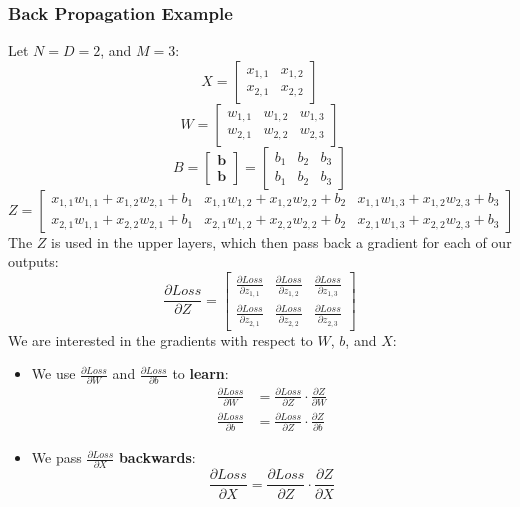 \documentclass[11pt]{article}
\begin{document}
\subsubsection{Back Propagation Example}
Let $N = D = 2$, and $M = 3$:
\[
  X = 
  \begin{bmatrix}
    x_{1, 1} & x_{1, 2} \\
    x_{2, 1} & x_{2, 2}
  \end{bmatrix}
\]
\[
  W =
  \begin{bmatrix}
    w_{1, 1} & w_{1, 2} & w_{1, 3} \\
    w_{2, 1} & w_{2, 2} & w_{2, 3}
  \end{bmatrix}
\]
\[
  B = \begin{bmatrix} \textbf{b} \\ \textbf{b} \end{bmatrix} 
  = \begin{bmatrix}
    b_1 & b_2 & b_3 \\
    b_1 & b_2 & b_3
  \end{bmatrix}
\]
\[
  Z = \begin{bmatrix}
    x_{1,1}w_{1,1} + x_{1,2}w_{2,1} + b_1 & 
    x_{1,1}w_{1,2} + x_{1,2}w_{2,2} + b_2 &
    x_{1,1}w_{1,3} + x_{1,2}w_{2,3} + b_3 \\
    x_{2,1}w_{1,1} + x_{2,2}w_{2,1} + b_1 & 
    x_{2,1}w_{1,2} + x_{2,2}w_{2,2} + b_2 &
    x_{2,1}w_{1,3} + x_{2,2}w_{2,3} + b_3
  \end{bmatrix}
\]
The $Z$ is used in the upper layers, which then pass back a gradient for each of our outputs:
\[
  \frac{\partial Loss}{\partial Z} = \begin{bmatrix}
    \frac{\partial Loss}{\partial z_{1, 1}} &
    \frac{\partial Loss}{\partial z_{1, 2}} &
    \frac{\partial Loss}{\partial z_{1, 3}} \\
    \frac{\partial Loss}{\partial z_{2, 1}} &
    \frac{\partial Loss}{\partial z_{2, 2}} &
    \frac{\partial Loss}{\partial z_{2, 3}}
  \end{bmatrix}
\]
We are interested in the gradients with respect to $W$, $b$, and $X$:
\begin{itemize}
  \item We use $\frac{\partial Loss}{\partial W}$ and $\frac{\partial Loss}{\partial b}$ to \textbf{learn}:
    \begin{align*}
      \frac{\partial Loss}{\partial W} &= \frac{\partial Loss}{\partial Z} \cdot \frac{\partial Z}{\partial W} \\
      \frac{\partial Loss}{\partial b} &= \frac{\partial Loss}{\partial Z} \cdot \frac{\partial Z}{\partial b}
    \end{align*}
  \item We pass $\frac{\partial Loss}{\partial X}$ \textbf{backwards}:
    \[
      \frac{\partial Loss}{\partial X} = \frac{\partial Loss}{\partial Z} \cdot \frac{\partial Z}{\partial X}
    \]
\end{itemize}
\end{document}
